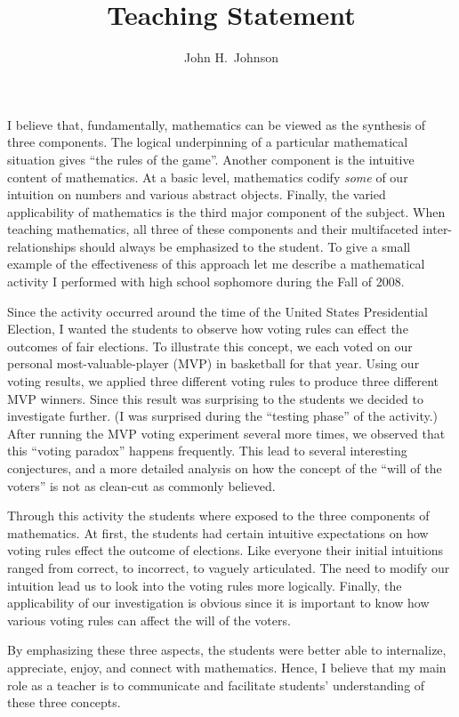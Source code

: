 \documentclass[12pt]{article}
\title{Teaching Statement}
\author{John H.~Johnson}
\begin{document}
\maketitle
I believe that, fundamentally, mathematics can be viewed as the
synthesis of three components.
The logical underpinning of a particular mathematical situation gives
``the rules of the game''.
Another component is the intuitive content of mathematics.
At a basic level, mathematics codify \textsl{some} of our intuition on
numbers and various abstract objects.
Finally, the varied applicability of mathematics is the third major
component of the subject.
When teaching mathematics, all three of these components and their
multifaceted inter-relationships should always be emphasized to the
student. 
To give a small example of the effectiveness of this approach let me
describe a mathematical activity I performed with high school
sophomore during the Fall of 2008. 

Since the activity occurred around the time of the United States
Presidential Election, I wanted the students to observe how voting
rules can effect the outcomes of fair elections.
To illustrate this concept, we each voted on our personal
most-valuable-player (MVP) in basketball for that year.
Using our voting results, we applied three different voting rules to
produce three different MVP winners.
Since this result was surprising to the students we decided to
investigate further. 
(I was surprised during the ``testing phase'' of the activity.)
After running the MVP voting experiment several more times, we
observed that this ``voting paradox'' happens frequently. 
This lead to several interesting conjectures, and a more detailed
analysis on how the concept of the ``will of the voters'' is not as
clean-cut as commonly believed.

Through this activity the students where exposed to the three
components of mathematics.
At first, the students had certain intuitive expectations on how
voting rules effect the outcome of elections.
Like everyone their initial intuitions ranged from correct, to
incorrect, to vaguely articulated.
The need to modify our intuition lead us to look into the voting rules
more logically.
Finally, the applicability of our investigation is obvious since it is
important to know how various voting rules can affect the will of the
voters. 

By emphasizing these three aspects, the students were better able to
internalize, appreciate, enjoy, and connect with mathematics. 
Hence, I believe that my main role as a teacher is to communicate and
facilitate students' understanding of these three concepts.
\end{document}
